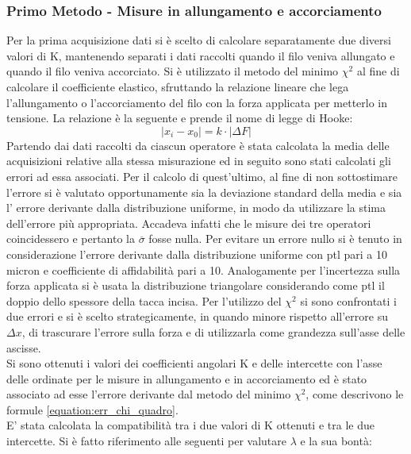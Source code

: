 \documentclass[a4paper,11pt,oneside]{article}
\begin{document}
\subsubsection*{Primo Metodo - Misure in allungamento e accorciamento}
Per la prima acquisizione dati si è scelto di calcolare separatamente due diversi valori di K, mantenendo separati i dati raccolti quando il filo veniva allungato e quando il filo veniva accorciato. Si è utilizzato il metodo del minimo $\chi^2$ al fine di calcolare il coefficiente elastico, sfruttando la relazione lineare che lega l'allungamento o l'accorciamento del filo con la forza applicata per metterlo in tensione. La relazione è la seguente e prende il nome di legge di Hooke:
\begin{equation*}
       \left | x_i - x_0  \right |  = k \cdot  \left | \Delta F \right |
\end{equation*}
Partendo dai dati raccolti da ciascun operatore è stata calcolata la media delle acquisizioni relative alla stessa misurazione ed in seguito sono stati calcolati gli errori ad essa associati. Per il calcolo di quest'ultimo, al fine di non sottostimare l'errore si è  valutato opportunamente sia la deviazione standard della media e sia l' errore derivante dalla distribuzione uniforme, in modo da utilizzare la stima dell'errore più appropriata. Accadeva infatti che le misure dei tre operatori coincidessero e pertanto la $\overline{\sigma}$ fosse nulla. Per evitare un errore nullo si è tenuto in considerazione l'errore derivante dalla distribuzione uniforme con ptl pari a 10 micron e coefficiente di affidabilità pari a 10.
Analogamente per l'incertezza sulla forza applicata si è usata la distribuzione triangolare considerando come ptl il doppio dello spessore della tacca incisa.
Per l'utilizzo del $\chi^2$ si sono confrontati i due errori e si è scelto strategicamente, in quando minore rispetto all'errore su $\Delta x$, di trascurare l'errore sulla forza e di utilizzarla come grandezza sull'asse delle ascisse.\\
Si sono ottenuti i valori dei coefficienti angolari K e delle intercette con l'asse delle ordinate per le misure in allungamento e in accorciamento ed è stato associato ad esse l'errore derivante dal metodo del minimo $\chi^2$, come descrivono le formule \ref{equation:err_chi_quadro}.\\
E' stata calcolata la compatibilità tra i due valori di K ottenuti e tra le due intercette. Si è fatto riferimento alle seguenti per valutare $\lambda$ e la sua bontà:
\end{document}
